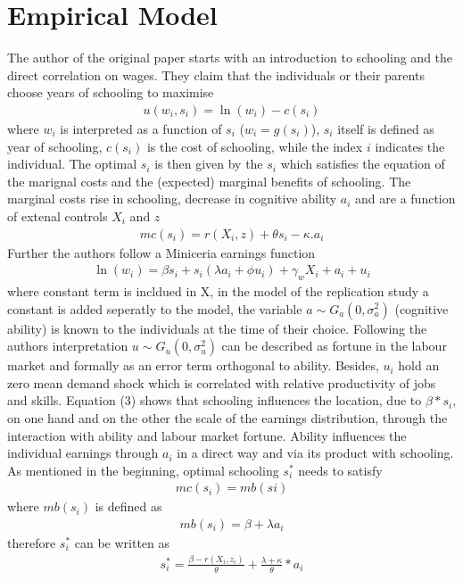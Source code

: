 \documentclass[12pt,a4paper]{article}
\begin{document}
\hypertarget{empirical-model}{%
\section{Empirical Model}\label{empirical-model}}

The author of the original paper starts with an introduction to
schooling and the direct correlation on wages. They claim that the
individuals or their parents choose years of schooling to maximise
\begin{align}u\left(w_{i}, s_{i}\right)=\ln \left(w_{i}\right)-c\left(s_{i}\right)\end{align}
where \(w_i\) is interpreted as a function of \(s_i\)
(\(w_i = g(s_i)\)), \(s_i\) itself is defined as year of schooling,
\(c(s_i)\) is the cost of schooling, while the index \(i\) indicates the
individual. The optimal \(s_i\) is then given by the \(s_i\) which
satisfies the equation of the marignal costs and the (expected) marginal
benefits of schooling. The marginal costs rise in schooling, decrease in
cognitive ability \(a_i\) and are a function of extenal controls \(X_i\)
and \(z\)
\begin{align} mc\left(s_{i}\right)=r\left(X_{i}, z\right)+\theta s_{i}-\kappa .
a_{i}\end{align} Further the authors follow a Miniceria earnings
function
\begin{align}\ln\left(w_{i}\right)=\beta s_{i}+s_{i}\left(\lambda a_{i}+\phi u_{i}\right)+\gamma_{w} X_{i}+a_{i}+u_{i}\end{align}
where constant term is incldued in X, in the model of the replication
study a constant is added seperatly to the model, the variable
\(a \sim G_a(0,\sigma^2_a)\) (cognitive ability) is known to the
individuals at the time of their choice. Following the authors
interpretation \(u \sim G_u(0,\sigma^2_u)\) can be described as fortune
in the labour market and formally as an error term orthogonal to
ability. Besides, \(u_i\) hold an zero mean demand shock which is
correlated with relative productivity of jobs and skills. Equation (3)
shows that schooling influences the location, due to \(\beta*s_i\), on
one hand and on the other the scale of the earnings distribution,
through the interaction with ability and labour market fortune. Ability
influences the individual earnings through \(a_i\) in a direct way and
via its product with schooling. As mentioned in the beginning, optimal
schooling \(s_i^*\) needs to satisfy
\begin{align}mc(s_i) = mb(si)\end{align} where \(mb(s_i)\) is defined as
\begin{align} mb(s_i)= \beta + \lambda a_i \end{align} therefore
\(s_i^*\) can be written as
\begin{align} s_i^* = \frac{\beta - r(X_i, z_i)}{\theta} + \frac{\lambda  + \kappa}{\theta}*a_i \end{align}
\end{document}
